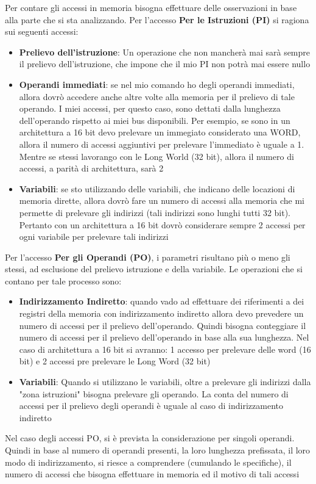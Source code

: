 Per contare gli accessi in memoria bisogna effettuare delle osservazioni in base alla parte che si sta analizzando.
Per l'accesso \textbf{Per le Istruzioni (PI)} si ragiona sui seguenti accessi:
\begin{itemize}
    \item \textbf{Prelievo dell'istruzione}: Un operazione che non mancherà mai sarà sempre il prelievo dell'istruzione, che impone che il mio PI non potrà mai essere nullo
    \item \textbf{Operandi immediati}: se nel mio comando ho degli operandi immediati, allora dovrò accedere anche altre volte alla memoria per il prelievo di tale operando. I miei accessi, per questo caso, sono dettati dalla lunghezza dell'operando rispetto ai miei bus disponibili. Per esempio, se sono in un architettura a 16 bit devo prelevare un immegiato considerato una WORD, allora il numero di accessi aggiuntivi per prelevare l'immediato è uguale a 1. Mentre se stessi lavorango con le Long World (32 bit), allora il numero di accessi, a parità di architettura, sarà 2
    \item \textbf{Variabili}: se sto utilizzando delle variabili, che indicano delle locazioni di memoria dirette, allora dovrò fare un numero di accessi alla memoria che mi permette di prelevare gli indirizzi (tali indirizzi sono lunghi tutti 32 bit). Pertanto con un architettura a 16 bit dovrò considerare sempre 2 accessi per ogni variabile per prelevare tali indirizzi
\end{itemize}

Per l'accesso \textbf{Per gli Operandi (PO)}, i parametri risultano più o meno gli stessi, ad esclusione del prelievo istruzione e della variabile. Le operazioni che si contano per tale processo sono:
\begin{itemize}
    \item \textbf{Indirizzamento Indiretto}: quando vado ad effettuare dei riferimenti a dei registri della memoria con indirizzamento indiretto allora devo prevedere un numero di accessi per il prelievo dell'operando. Quindi bisogna conteggiare il numero di accessi per il prelievo dell'operando in base alla sua lunghezza. Nel caso di architettura a 16 bit si avranno: 1 accesso per prelevare delle word (16 bit) e 2 accessi pre prelevare le Long Word (32 bit)

    \item \textbf{Variabili}: Quando si utilizzano le variabili, oltre a prelevare gli indirizzi dalla "zona istruzioni" bisogna prelevare gli operando. La conta del numero di accessi per il prelievo degli operandi è uguale al caso di indirizzamento indiretto
\end{itemize}

Nel caso degli accessi PO, si è prevista la considerazione per singoli operandi. Quindi in base al numero di operandi presenti, la loro lunghezza prefissata, il loro modo di indirizzamento, si riesce a comprendere (cumulando le specifiche), il numero di accessi che bisogna effettuare in memoria ed il motivo di tali accessi
